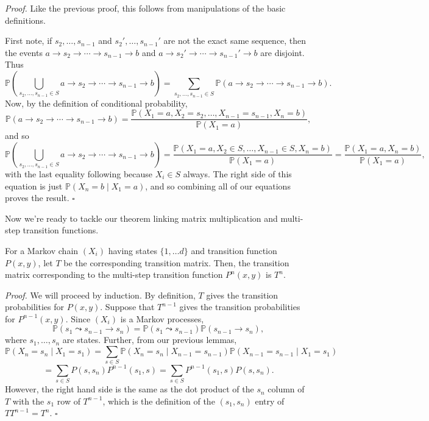 \documentclass{problemset}
\renewcommand{\P}{\mathbb{P}}
\newenvironment{proof}{\emph{Proof.}}{\hfill$\square$}
\begin{document}
	\begin{proof}
		Like the previous proof, this follows from manipulations of the basic definitions.

		First note, if $s_2,\ldots, s_{n-1}$ and $s_2',\ldots, s_{n-1}'$ are not the exact
		same sequence, then the events $a\to s_2\to \cdots \to s_{n-1}\to b$ and
		$a\to s_2'\to \cdots \to s_{n-1}'\to b$ are disjoint.  Thus
		\[
			\P\left(\bigcup_{s_2,\ldots,s_{n-1}\in S} a\to s_2\to \cdots \to s_{n-1}\to b\right) = 
			\sum_{s_2,\ldots,s_{n-1}\in S} \P(a\to s_2\to \cdots \to s_{n-1}\to b).
		\]
		Now, by the definition of conditional probability,
		\[
			\P(a\to s_2\to \cdots \to s_{n-1}\to b) = \frac{\P(X_1=a, X_2=s_2,\ldots, X_{n-1}=s_{n-1},X_n=b)}{\P(X_1=a)},
		\]
		and so
		\[
			\P\left(\bigcup_{s_2,\ldots,s_{n-1}\in S} a\to s_2\to \cdots \to s_{n-1}\to b\right)
			=\frac{\P(X_1=a, X_2\in S,\ldots, X_{n-1}\in S,X_n=b)}{\P(X_1=a)} = \frac{\P(X_1=a, X_n=b)}{\P(X_1=a)},
		\]
		with the last equality following because  $X_i\in S$ always.  The right side of this equation
		is just $\P(X_n=b\mid X_1=a)$, and so combining all of our equations proves the result.
	\end{proof}


	Now we're ready to tackle our theorem linking matrix multiplication and multi-step transition
	functions.
	
	\begin{theorem}
		For a Markov chain $(X_i)$ having states $\{1,\ldots d\}$ and transition function $P(x,y)$,
		let $T$ be the corresponding transition matrix.  Then, the transition matrix corresponding 
		to the multi-step transition function $P^n(x,y)$ is $T^n$.
	\end{theorem}

	\begin{proof}
		We will proceed by induction.  
		By definition, $T$ gives the transition probabilities for $P(x,y)$.
		Suppose that $T^{n-1}$ gives the transition probabilities for $P^{n-1}(x,y)$.  Since
		$(X_i)$ is a Markov processes, 
		\[
			\P(s_1\leadsto s_{n-1}\to s_n) = \P(s_1\leadsto s_{n-1})\P(s_{n-1}\to s_n),
		\]
		where $s_1,\ldots, s_n$ are states.  Further, from our previous lemmas,
		\[
			\P(X_n=s_n\mid X_1=s_1) = \sum_{s\in S} \P(X_n=s_n\mid X_{n-1}=s_{n-1})\P(X_{n-1}=s_{n-1}\mid 
			X_1=s_1) 
		\]\[
			= \sum_{s\in S} P(s,s_n)P^{n-1}(s_1,s)
			= \sum_{s\in S} P^{n-1}(s_1,s)P(s,s_n).
		\]
		However, the right hand side is the same as the dot product of the $s_n$ column of $T$ with the
		$s_1$ row of $T^{n-1}$, which is the definition of the $(s_1,s_n)$ entry of $TT^{n-1}=T^n$.
	\end{proof}
\end{document}
